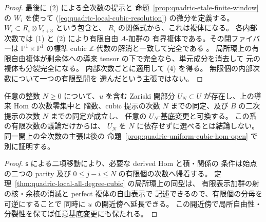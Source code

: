\begin{proof}
最後に (2) による全次数の提示と
命題~\ref{prop:quadric-etale-finite-window} の $W_i$ を使って
(\ref{eq:quadric-local-cubic-resolution}) の微分を定義する。
$W_i\subset R_i\otimes V_{i+3}$ という包含と、
$R_i$ の関係式から、これは複体になる。
各内部次数では (1) と (2) により有限自由 $A$-加群の
有界複体である。その閉ファイバーは
$\mathbb P^1\times\mathbb P^1$ の標準 cubic
$\mathbb Z$-代数の解消と一致して完全である
\cite[\S4.2]{VdB2011}。
局所環上の有限自由複体が剰余体への導来 tensor
の下で完全なら、単元成分を消去して
元の複体も分裂完全になる。
内部次数ごとに適用して (4) を得る。
無限個の内部次数について一つの有限型開を
選んだという主張ではない。
\end{proof}

\begin{corollary}[各有限次数の開近傍への拡張]
\label{cor:quadric-each-finite-degree-open}
任意の整数 $N\ge0$ について、$u$ を含む Zariski 開部分
$U_N\subset U$ が存在し、上の導来 Hom の次数零集中と
階数、cubic 提示の次数 $N$ までの同定、及び
$B$ の二次提示の次数 $N$ までの同定が成立し、
任意の $U_N$-基底変更と可換する。
この系の有限次数の議論だけからは、
$U_N$ を $N$ に依存せずに選べるとは結論しない。
同一開上の全次数の主張は後の
命題~\ref{prop:quadric-uniform-cubic-hom-open} で別に証明する。
\end{corollary}
\begin{proof}
$\mathsf s$ による二項移動により、必要な derived Hom と積・関係の
条件は始点の二つの parity 及び $0\le j-i\le N$
の有限個の次数へ帰着する。
定理~\ref{thm:quadric-local-all-degree-cubic} の局所環上の同型は、
有限表示加群の射の核・余核の消滅と perfect 複体の自由表示で
記述できるので、有限個の分母を可逆にすることで
同時に $u$ の開近傍へ延長できる。
この開近傍で局所自由性・分裂性を保てば任意基底変更にも保たれる。
\end{proof}


